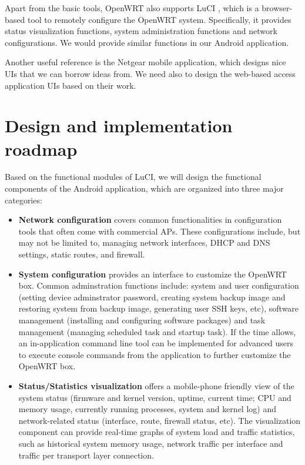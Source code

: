\documentclass{sig-alternate-05-2015}
\begin{document}
	Apart from the basic tools, OpenWRT also supports LuCI \cite{LuCI}, which is a browser-based tool to remotely configure the OpenWRT system. Specifically, it provides status visualization functions, system administration functions and network configurations. We would provide similar functions in our Android application.
	
	Another useful reference is the Netgear \cite{netgear} mobile application, which designs nice UIs that we can borrow ideas from. We need also to design the web-based access application UIs based on their work.
	
	\section{Design and implementation \\ roadmap}
	
	Based on the functional modules of LuCI, we will design the functional components of the Android application, which are organized into three major categories:
	
	\begin{itemize}
		
		\item
		\textbf{Network configuration} covers common functionalities in configuration tools that often come with commercial APs. These configurations include, but may not be limited to, managing network interfaces, DHCP and DNS settings, static routes, and firewall.
		
		\item
		\textbf{System configuration} provides an interface to customize the OpenWRT box. Common adminstration functions include: system and user configuration (setting device adminstrator password, creating system backup image and restoring system from backup image, generating user SSH keys, etc), software management (installing and configuring software packages) and task management (managing scheduled task and startup task). If the time allows, an in-application command line tool can be implemented for advanced users to execute console commands from the application to further customize the OpenWRT box.
		
		\item
		\textbf{Status/Statistics visualization} offers a mobile-phone friendly view of the system status (firmware and kernel version, uptime, current time; CPU and memory usage, currently running processes, system and kernel log) and network-related status (interface, route, firewall status, etc). The visualization component can provide real-time graphs of system load and traffic statistics, such as historical system memory usage, network traffic per interface and traffic per transport layer connection.
		
	\end{itemize}
	
\end{document}
